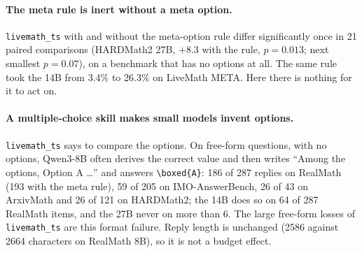 \documentclass[11pt]{article}
\begin{document}
\begin{table}[t]
\centering\small
\setlength{\tabcolsep}{4pt}
\caption{Text skills on the shortcut-free suite (test splits): accuracy of no skill, and change in
points for every other condition. $^{*}$ $p<0.05$, exact McNemar, uncorrected; bold = survives Holm
correction within the row. $^{\dagger}$ = at least 20\% of replies answer a free-form question with
an option letter that does not exist. MCQ rows above the rule, free-form rows below. Greedy,
thinking off, answer forcing, 2048 tokens (4096 for the 27B).}
\label{tab:clean}
\end{table}

\paragraph{The meta rule is inert without a meta option.} \texttt{livemath\_ts} with and without the
meta-option rule differ significantly once in 21 paired comparisons (HARDMath2 27B, $+8.3$ with the
rule, $p=0.013$; next smallest $p=0.07$), on a benchmark that has no options at all. The same rule
took the 14B from 3.4\% to 26.3\% on LiveMath META. Here there is nothing for it to act on.

\paragraph{A multiple-choice skill makes small models invent options.} \texttt{livemath\_ts} says to
compare the options. On free-form questions, with no options, Qwen3-8B often derives the correct
value and then writes ``Among the options, Option A \ldots'' and answers \verb|\boxed{A}|: 186 of 287
replies on RealMath (193 with the meta rule), 59 of 205 on IMO-AnswerBench, 26 of 43 on ArxivMath and
26 of 121 on HARDMath2; the 14B does so on 64 of 287 RealMath items, and the 27B never on more than 6.
The large free-form losses of \texttt{livemath\_ts} are this format failure. Reply length is
unchanged (2586 against 2664 characters on RealMath 8B), so it is not a budget effect.
\end{document}
